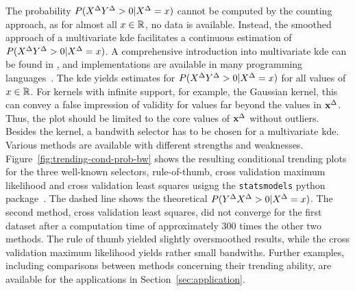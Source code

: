 The probability $P(X^{\Delta} Y^{\Delta} > 0 | X^{\Delta} = x)$ cannot be computed by the counting approach, as for almost all $x \in \mathbb{R}$, no data is available.
Instead, the smoothed approach of a multivariate \acf{kde} facilitates a continuous estimation of $P(X^{\Delta} Y^{\Delta} > 0 | X^{\Delta} = x)$.
A comprehensive introduction into multivariate \ac{kde} can be found in \textcite{Gramacki2018}, and implementations are available in many programming languages~\parencite[e.g., for  Python in][]{Seabold2010}.
The \ac{kde} yields estimates for $P(X^{\Delta} Y^{\Delta} > 0 | X^{\Delta} = x)$ for all values of $x \in \mathbb{R}$.
For kernels with infinite support, for example, the Gaussian kernel, this can convey a false impression of validity for values far beyond the values in $\mathbf{x}^{\Delta}$.
Thus, the plot should be limited to the core values of $\mathbf{x}^{\Delta}$ without outliers.
Besides the kernel, a bandwith selector has to be chosen for a multivariate \ac{kde}.
Various methods are available with different strengths and weaknesses.
Figure~\ref{fig:trending-cond-prob-bw} shows the resulting conditional trending plots for the three well-known selectors, rule-of-thumb, cross validation maximum likelihood and cross validation least squares usigng the \verb|statsmodels| python package~\parencite{Seabold2010}.
The dashed line shows the theoretical $P(Y^{\Delta} X^{\Delta} > 0 | X^{\Delta} = x)$.
The second method, cross validation least squares, did not converge for the first dataset after a computation time of approximately 300 times the other two methods.
The rule of thumb yielded slightly oversmoothed results, while the cross validation maximum likelihood yields rather small bandwiths.
Further examples, including comparisons between methods concerning their trending ability, are available for the applications in Section~\ref{sec:application}.

